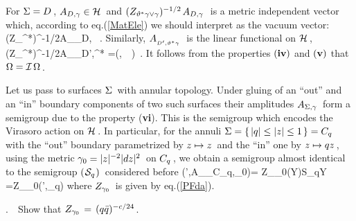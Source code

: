 \vs 0.4cm

For \s$\Sigma=D\hspace{0.05cm}$, \s$A_{{D,{{\gamma}}}}\in{\cal H}\hspace{0.05cm}$ and
\s\s$(Z_{\vartheta^*\ga\vee\ga})^{-1/2}\s A_{{D,\ga}}\s\s$
is a metric independent vector which, according to
eq.\s\s(\ref{MatEle}) we should interpret as
the vacuum vector:
\qq
(Z_{\vartheta^*\ga\vee\ga})^{-1/2}\s A_{_{D,\ga}}\s
\equiv\s\Omega\ .
\label{vac}
\qqq
Similarly, \s\s$A_{_{D',\vartheta^*\ga}}
\s\s$ is the linear functional on \s${\cal H}\hspace{0.05cm}$,
\qq
(Z_{\vartheta^*\ga\vee\ga})^{-1/2}\s A_{_{D',\vartheta^*\ga}}
\s=\s(\s\Omega\s,\s\ \cdot\ \s)\ .
\non
\qqq
It follows from the properties $({\bf iv})$ and $({\bf v})$
that \s$\Omega={\cal I}\hspace{0.05cm}\Omega\hspace{0.05cm}$.
\vs 0.6cm

\vs 0.5cm

Let us pass to surfaces \s$\Sigma\hspace{0.05cm}$
with annular topology. Under gluing of an ``out'' and an
``in'' boundary components of two such surfaces
their amplitudes \s$A_{{\Sigma,{{\gamma}}}}\hspace{0.05cm}$ form a semigroup
due to the property ({\bf vi}).
\no This is the semigroup which encodes
the Virasoro action on \s${\cal H}\hspace{0.05cm}$. \s In particular,
for the annuli \s$\Sigma=\{\hspace{0.05cm}
|q|\leq |z|\leq 1\hspace{0.05cm}\}=
{C_q}\hspace{0.05cm}$ with the ``out'' boundary
parametrized by \s$z\mapsto z\hspace{0.05cm}$ and the ``in'' one
by \s$z\mapsto qz\hspace{0.05cm}$, using the metric \s${{\gamma}}_0=|z|^{-2}|dz|^2\hspace{0.05cm}$
on \s${C_q}\hspace{0.05cm}$, \s we obtain a semigroup
almost identical to the semigroup \s$(\hspace{0.025cm}{\cal S}_q\hspace{0.025cm})\hspace{0.05cm}$
considered before
\qq
(\s\CY'\m,\s A_{_{{C_q},\ga_0}}\s\CY\s)\s=\s
Z_{\ga_0}\s\s\langle\s(\Theta Y)\s\s S_qY\s\rangle
\s=\s Z_{\ga_0}\s\s(\s\CY'\m,\s\CS_q\s\CY\s)
\label{62}
\qqq
where \s$Z_{{{\gamma}}_0}\hspace{0.05cm}$ is given by eq.\s\s(\ref{PFda}).
\vs 0.5cm

.\ \ Show that \s$Z_{{{\gamma}}_0}\hspace{0.05cm}=\hspace{0.05cm}(q\bar q)^{-c/24}\hspace{0.05cm}$.
\label{63}
\vs 0.5cm


